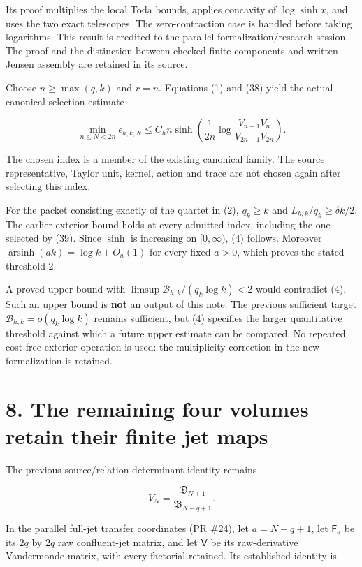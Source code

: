 \documentclass[
  11pt,
]{article}
\begin{document}
Its proof multiplies the local Toda bounds, applies concavity of
\(\log\sinh x\), and uses the two exact telescopes. The zero-contraction
case is handled before taking logarithms. This result is credited to the
parallel formalization/research session. The proof and the distinction
between checked finite components and written Jensen assembly are
retained in its source.

Choose \(n\ge\max(q,k)\) and \(r=n\). Equations (1) and (38) yield the
actual canonical selection estimate

\[
 \boxed{
 \min_{n\le N<2n}\epsilon_{h,k,N}
 \le C_hn\sinh\!\left(\frac1{2n}
                 \log\frac{V_{n-1}V_n}{V_{2n-1}V_{2n}}\right).
 }                                                                     \tag{39}
\]

The chosen index is a member of the existing canonical family. The
source representative, Taylor unit, kernel, action and trace are not
chosen again after selecting this index.

For the packet consisting exactly of the quartet in (2), \(q_k\ge k\)
and \(L_{h,k}/q_k\ge\delta k/2\). The earlier exterior bound holds at
every admitted index, including the one selected by (39). Since
\(\sinh\) is increasing on \([0,\infty)\), (4) follows. Moreover
\(\operatorname{arsinh}(ak)=\log k+O_a(1)\) for every fixed \(a>0\),
which proves the stated threshold \(2\).

A proved upper bound with \(\limsup\mathcal B_{h,k}/(q_k\log k)<2\)
would contradict (4). Such an upper bound is \textbf{not} an output of
this note. The previous sufficient target
\(\mathcal B_{h,k}=o(q_k\log k)\) remains sufficient, but (4) specifies
the larger quantitative threshold against which a future upper estimate
can be compared. No repeated cost-free exterior operation is used: the
multiplicity correction in the new formalization is retained.

\section{8. The remaining four volumes retain their finite jet
maps}\label{the-remaining-four-volumes-retain-their-finite-jet-maps}

The previous source/relation determinant identity remains

\[
 V_N=\frac{\mathfrak D_{N+1}}{\mathfrak B_{N-q+1}}.
                                                                         \tag{40}
\]

In the parallel full-jet transfer coordinates (PR \#24), let
\(a=N-q+1\), let \(\mathsf F_a\) be its \(2q\) by \(2q\) raw
confluent-jet matrix, and let \(\mathsf V\) be its raw-derivative
Vandermonde matrix, with every factorial retained. Its established
identity is
\end{document}
